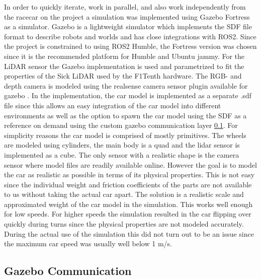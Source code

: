 In order to quickly iterate, work in parallel, and also work independently from the racecar on the project a simulation was implemented using Gazebo Fortress as a simulator.
Gazebo is a lightweight simulator which implements the SDF file format to describe robots and worlds and has close integrations with ROS2.
Since the project is constrained to using ROS2 Humble, the Fortress version was chosen since it is the recommended platform for Humble and Ubuntu jammy.
For the LiDAR sensor the Gazebo implementation \cite{gazebo-lidar} is used and parametrized to fit the properties of the Sick LiDAR used by the F1Tenth hardware.
The RGB- and depth camera is modeled using the realsense camera sensor plugin available for gazebo \cite{realsense-gazebo}.
In the implementation, the car model is implemented as a separate .sdf file since this allows an easy integration of the car model into different environments as well as the option to spawn the car model using the SDF as a reference on demand using the custom gazebo communication layer \ref{gazebo-communication}.
For simplicity reasons the car model is comprised of mostly primitives. The wheels are modeled using cylinders, the main body is a quad and the lidar sensor is implemented as a cube. The only sensor with a realistic shape is the camera sensor where model files are readily available online. However the goal is to model the car as realistic as possible in terms of its physical properties. This is not easy since the individual weight and friction coefficients of the parts are not available to us without taking the actual car apart. The solution is a realistic scale and approximated weight of the car model in the simulation. This works well enough for low speeds. For higher speeds the simulation resulted in the car flipping over quickly during turns since the physical properties are not modeled accurately.
During the actual use of the simulation this did not turn out to be an issue since the maximum car speed was usually well below 1 m/s.


\subsection{Gazebo Communication}
\label{gazebo-communication}

